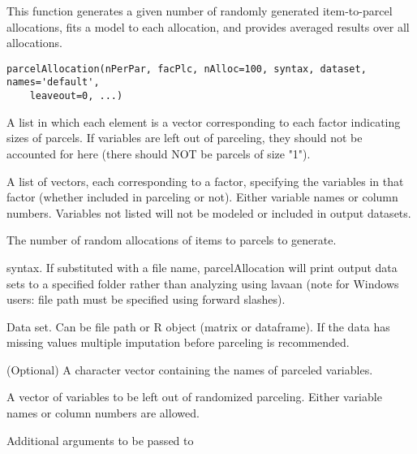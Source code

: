 \documentclass[a4paper]{book}
\begin{document}
%
\begin{Description}\relax
This function generates a given number of randomly generated item-to-parcel allocations, fits a model to each allocation, and provides averaged results over all allocations. 
\end{Description}
%
\begin{Usage}
\begin{verbatim}
parcelAllocation(nPerPar, facPlc, nAlloc=100, syntax, dataset, names='default', 
	leaveout=0, ...)
\end{verbatim}
\end{Usage}
%
\begin{Arguments}
\begin{ldescription}
\item[\code{nPerPar}] A list in which each element is a vector corresponding to each factor indicating sizes of parcels. If variables are left out of parceling, they should not be accounted for here (there should NOT be parcels of size "1").
\item[\code{facPlc}] A list of vectors, each corresponding to a factor, specifying the variables in that factor (whether included in parceling or not). Either variable names or column numbers. Variables not listed will not be modeled or included in output datasets. 
\item[\code{nAlloc}] The number of random allocations of items to parcels to generate.	
\item[\code{syntax}]  syntax. If substituted with a file name, parcelAllocation will print output data sets to a specified folder rather than analyzing using lavaan (note for Windows users: file path must be specified using forward slashes).
\item[\code{dataset}] Data set. Can be file path or R object (matrix or dataframe). If the data has missing values multiple imputation before parceling is recommended.
\item[\code{names}] (Optional) A character vector containing the names of parceled variables.
\item[\code{leaveout}] A vector of variables to be left out of randomized parceling. Either variable names or column numbers are allowed.
\item[\code{...}] Additional arguments to be passed to 
\end{ldescription}
\end{Arguments}
\end{document}
